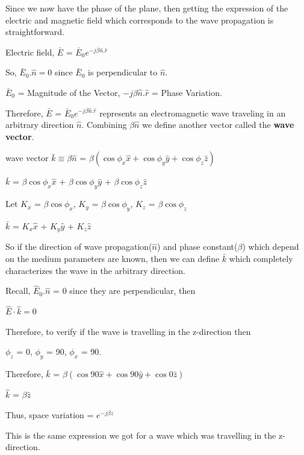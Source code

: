 Since we now have the phase of the plane, then getting the expression of the electric and magnetic field which corresponds to the wave propagation is straightforward.
\begin{center}

Electric field, $\bar{E}$ = $\bar{E}_{0}e^{-j\beta \hat{n}.\hat{r}}$

\end{center}
So, $\bar{E}_{0}.\hat{n} = 0$ since $\bar{E}_{0}$ is perpendicular to $\hat{n}$.

$\bar{E}_{0}$ = Magnitude of the Vector,
$-j\beta \hat{n}.\hat{r}$ = Phase Variation.

Therefore, $\bar{E}$ = $\bar{E}_{0}e^{-j\beta \hat{n}.\hat{r}}$ represents an electromagnetic wave traveling in an arbitrary direction $\hat{n}$.
Combining $\beta\hat{n}$ we define another vector called the \textbf{wave vector}.

wave vector $\bar{k} \equiv \beta \hat{n}$ = $\beta(\cos\phi_{x}\hat{x} + \cos\phi_{y}\hat{y} + \cos\phi_{z}\hat{z})$
\begin{center}
$\bar{k}$ = $\beta\cos\phi_{x}\hat{x}$ + $\beta\cos\phi_{y}\hat{y}$ + $\beta\cos\phi_{z}\hat{z}$
\end{center}
Let $K_{x}$ = $\beta\cos\phi_{x}$, $K_{y}$ = $\beta\cos\phi_{y}$, 
$K_{z}$ = $\beta\cos\phi_{z}$

$\bar{k}$ = $K_{x}\hat{x}$ + $K_{y}\hat{y}$ + $K_{z}\hat{z}$

So if the direction of wave propagation($\hat{n}$) and phase constant($\beta$) which depend on the medium parameters are known, then we can define $\bar{k}$ which completely characterizes the wave in the arbitrary direction.

Recall, $\hat{E}_{0}.\hat{n}$ = 0 since they are perpendicular, then
\begin{center}
$\hat{E}\cdot \hat{k} = 0$
\end{center}
Therefore, to verify if the wave is travelling in the z-direction then
\begin{center}
$\phi_{z}$ = 0, $\phi_{y}$ = 90\textdegree, $\phi_{x}$ = 90\textdegree.

Therefore, $\bar{k}$ = $\beta(\cos90\hat{x} + \cos90\hat{y} + \cos0\hat{z})$

$\hat{k}$ = $\beta\hat{z}$

Thus, space variation = $e^{-j\beta z}$
\end{center}
This is the same expression we got for a wave which was travelling in the z-direction.


